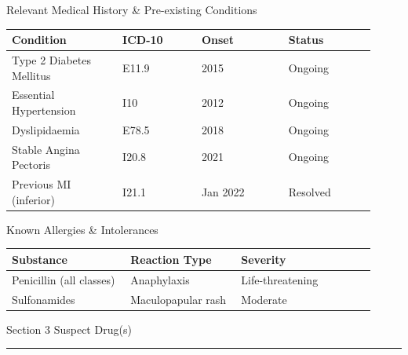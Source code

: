 \documentclass[11pt,a4paper]{scrartcl}
\newcommand{\sectionrule}{%
  \vspace{1pt}%
  {\color{WarmGold}\rule{\linewidth}{1.5pt}}%
  \vspace{4pt}%
}
\begin{document}
\vspace{4mm}

\begin{subsecbox}{Relevant Medical History \& Pre-existing Conditions}
\end{subsecbox}

\vspace{2mm}
\begin{tabular}{@{}L{0.28\linewidth}L{0.20\linewidth}L{0.22\linewidth}L{0.22\linewidth}@{}}
\toprule
{}
\small\bfseries Condition & \small\bfseries ICD-10 & \small\bfseries Onset & \small\bfseries Status \\
\midrule
Type 2 Diabetes Mellitus & E11.9 & 2015 & Ongoing \\
Essential Hypertension & I10 & 2012 & Ongoing \\
Dyslipidaemia & E78.5 & 2018 & Ongoing \\
Stable Angina Pectoris & I20.8 & 2021 & Ongoing \\
Previous MI (inferior) & I21.1 & Jan 2022 & Resolved \\
\bottomrule
\end{tabular}

\vspace{4mm}

\begin{subsecbox}{Known Allergies \& Intolerances}
\end{subsecbox}

\vspace{2mm}
\begin{tabular}{@{}L{0.30\linewidth}L{0.28\linewidth}L{0.34\linewidth}@{}}
\toprule
{}
\small\bfseries Substance & \small\bfseries Reaction Type & \small\bfseries Severity \\
\midrule
Penicillin (all classes) & Anaphylaxis & Life-threatening \\
Sulfonamides & Maculopapular rash & Moderate \\
\bottomrule
\end{tabular}

\vspace{6mm}

\begin{sectionbox}{\faCapsules\quad Section 3 \textbar{} Suspect Drug(s)}
\end{sectionbox}
\sectionrule
\end{document}
